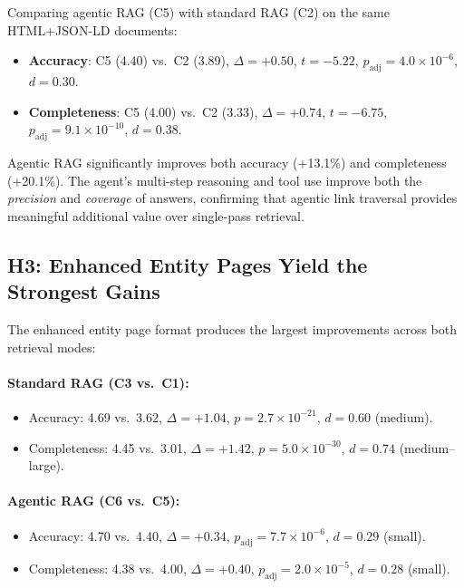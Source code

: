 \documentclass[runningheads]{llncs}
\begin{document}
Comparing agentic RAG (C5) with standard RAG (C2) on the same
HTML+JSON-LD documents:

\begin{itemize}
    \item \textbf{Accuracy}: C5 (4.40) vs.\ C2 (3.89), $\Delta = +0.50$,
          $t = -5.22$, $p_\text{adj} = 4.0 \times 10^{-6}$, $d = 0.30$.
    \item \textbf{Completeness}: C5 (4.00) vs.\ C2 (3.33),
          $\Delta = +0.74$, $t = -6.75$,
          $p_\text{adj} = 9.1 \times 10^{-10}$, $d = 0.38$.
\end{itemize}

Agentic RAG significantly improves both accuracy (+13.1\%) and
completeness (+20.1\%). The agent's multi-step reasoning and
tool use improve both the \emph{precision} and \emph{coverage} of
answers, confirming that agentic link traversal provides meaningful
additional value over single-pass retrieval.

\subsection{H3: Enhanced Entity Pages Yield the Strongest Gains}
\label{sec:h3}

The enhanced entity page format produces the largest improvements
across both retrieval modes:

\paragraph{Standard RAG (C3 vs.\ C1):}
\begin{itemize}
    \item Accuracy: 4.69 vs.\ 3.62, $\Delta = +1.04$,
          $p = 2.7 \times 10^{-21}$, $d = 0.60$ (medium).
    \item Completeness: 4.45 vs.\ 3.01, $\Delta = +1.42$,
          $p = 5.0 \times 10^{-30}$, $d = 0.74$ (medium--large).
\end{itemize}

\paragraph{Agentic RAG (C6 vs.\ C5):}
\begin{itemize}
    \item Accuracy: 4.70 vs.\ 4.40, $\Delta = +0.34$,
          $p_\text{adj} = 7.7 \times 10^{-6}$, $d = 0.29$ (small).
    \item Completeness: 4.38 vs.\ 4.00, $\Delta = +0.40$,
          $p_\text{adj} = 2.0 \times 10^{-5}$, $d = 0.28$ (small).
\end{itemize}
\end{document}
